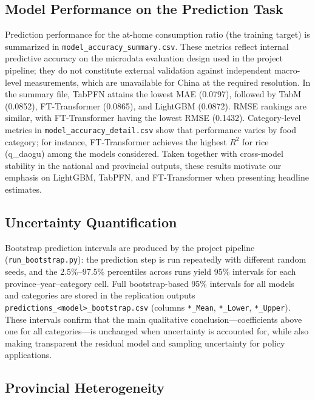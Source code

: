 \subsection{Model Performance on the Prediction Task}

Prediction performance for the at-home consumption ratio (the training target) is summarized in \texttt{model\_accuracy\_summary.csv}. These metrics reflect internal predictive accuracy on the microdata evaluation design used in the project pipeline; they do not constitute external validation against independent macro-level measurements, which are unavailable for China at the required resolution. In the summary file, TabPFN attains the lowest MAE (0.0797), followed by TabM (0.0852), FT-Transformer (0.0865), and LightGBM (0.0872). RMSE rankings are similar, with FT-Transformer having the lowest RMSE (0.1432). Category-level metrics in \texttt{model\_accuracy\_detail.csv} show that performance varies by food category; for instance, FT-Transformer achieves the highest $R^2$ for rice (q\_daogu) among the models considered. Taken together with cross-model stability in the national and provincial outputs, these results motivate our emphasis on LightGBM, TabPFN, and FT-Transformer when presenting headline estimates.

\subsection{Uncertainty Quantification}

Bootstrap prediction intervals are produced by the project pipeline (\texttt{run\_bootstrap.py}): the prediction step is run repeatedly with different random seeds, and the 2.5\%--97.5\% percentiles across runs yield 95\% intervals for each province--year--category cell. Full bootstrap-based 95\% intervals for all models and categories are stored in the replication outputs \texttt{predictions\_<model>\_bootstrap.csv} (columns \texttt{*\_Mean}, \texttt{*\_Lower}, \texttt{*\_Upper}). These intervals confirm that the main qualitative conclusion---coefficients above one for all categories---is unchanged when uncertainty is accounted for, while also making transparent the residual model and sampling uncertainty for policy applications.

\subsection{Provincial Heterogeneity}

